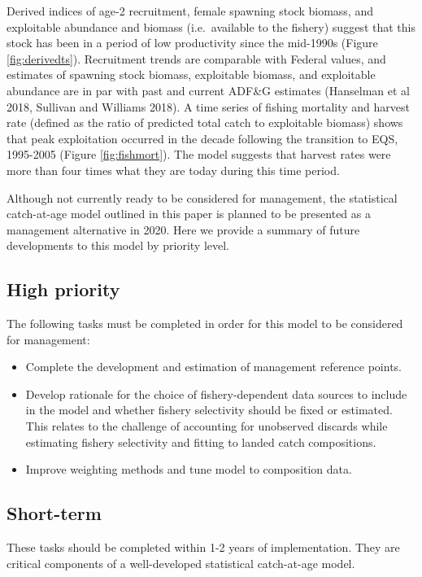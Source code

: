 \documentclass[]{article}
\providecommand{\tightlist}{%
  \setlength{\itemsep}{0pt}\setlength{\parskip}{0pt}}
\begin{document}
Derived indices of age-2 recruitment, female spawning stock biomass, and
exploitable abundance and biomass (i.e.~available to the fishery)
suggest that this stock has been in a period of low productivity since
the mid-1990s (Figure \ref{fig:derivedts}). Recruitment trends are
comparable with Federal values, and estimates of spawning stock biomass,
exploitable biomass, and exploitable abundance are in par with past and
current ADF\&G estimates (Hanselman et al 2018, Sullivan and Williams
2018). A time series of fishing mortality and harvest rate (defined as
the ratio of predicted total catch to exploitable biomass) shows that
peak exploitation occurred in the decade following the transition to
EQS, 1995-2005 (Figure \ref{fig:fishmort}). The model suggests that
harvest rates were more than four times what they are today during this
time period.

Although not currently ready to be considered for management, the
statistical catch-at-age model outlined in this paper is planned to be
presented as a management alternative in 2020. Here we provide a summary
of future developments to this model by priority level.

\subsection{High priority}\label{high-priority}

The following tasks must be completed in order for this model to be
considered for management:

\begin{itemize}
\tightlist
\item
  Complete the development and estimation of management reference
  points.
\item
  Develop rationale for the choice of fishery-dependent data sources to
  include in the model and whether fishery selectivity should be fixed
  or estimated. This relates to the challenge of accounting for
  unobserved discards while estimating fishery selectivity and fitting
  to landed catch compositions.
\item
  Improve weighting methods and tune model to composition data.
\end{itemize}

\subsection{Short-term}\label{short-term}

These tasks should be completed within 1-2 years of implementation. They
are critical components of a well-developed statistical catch-at-age
model.
\end{document}
